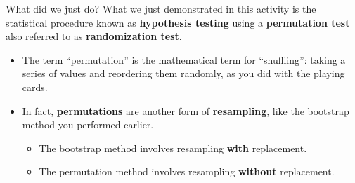 \documentclass[
  ignorenonframetext,
]{beamer}
\providecommand{\tightlist}{%
  \setlength{\itemsep}{0pt}\setlength{\parskip}{0pt}}
\begin{document}
\begin{frame}{What did we just do?}
\label{what-did-we-just-do}
What we just demonstrated in this activity is the statistical procedure
known as \textbf{hypothesis testing} using a \textbf{permutation test}
also referred to as \textbf{randomization test}.

\begin{itemize}
\item
  The term ``permutation'' is the mathematical term for ``shuffling'':
  taking a series of values and reordering them randomly, as you did
  with the playing cards.
\item
  In fact, \textbf{permutations} are another form of
  \textbf{resampling}, like the bootstrap method you performed earlier.

  \begin{itemize}
  \tightlist
  \item
    The bootstrap method involves resampling \textbf{with} replacement.
  \item
    The permutation method involves resampling \textbf{without}
    replacement.
  \end{itemize}
\end{itemize}
\end{frame}
\end{document}
